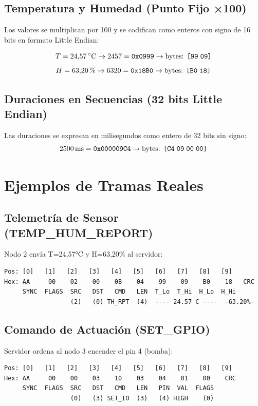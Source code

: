 \subsection{Temperatura y Humedad (Punto Fijo ×100)}

Los valores se multiplican por 100 y se codifican como enteros con signo de 16 bits
en formato Little Endian:

\[
T = 24{,}57\,^{\circ}\text{C} \rightarrow 2457 = \texttt{0x0999} \rightarrow \text{bytes: } \texttt{[99\;09]}
\]
\[
H = 63{,}20\,\% \rightarrow 6320 = \texttt{0x18B0} \rightarrow \text{bytes: } \texttt{[B0\;18]}
\]

\subsection{Duraciones en Secuencias (32 bits Little Endian)}

Las duraciones se expresan en milisegundos como entero de 32 bits sin signo:
\[
2500\,\text{ms} = \texttt{0x000009C4} \rightarrow \text{bytes: } \texttt{[C4\;09\;00\;00]}
\]

\section{Ejemplos de Tramas Reales}

\subsection{Telemetría de Sensor (TEMP\_HUM\_REPORT)}
Nodo 2 envía T=24,57°C y H=63,20\% al servidor:

\begin{lstlisting}[style=trama, caption={Trama TEMP\_HUM\_REPORT completa}]
Pos: [0]   [1]   [2]   [3]   [4]   [5]   [6]   [7]   [8]   [9]
Hex: AA     00    02    00    0B    04    99    09    B0    18   CRC
     SYNC  FLAGS  SRC   DST   CMD   LEN  T_Lo  T_Hi  H_Lo  H_Hi
                  (2)   (0) TH_RPT  (4)  ---- 24.57 C ----  -63.20%-
\end{lstlisting}

\subsection{Comando de Actuación (SET\_GPIO)}
Servidor ordena al nodo 3 encender el pin 4 (bomba):

\begin{lstlisting}[style=trama, caption={Trama SET\_GPIO}]
Pos: [0]   [1]   [2]   [3]   [4]   [5]   [6]   [7]   [8]   [9]
Hex: AA     00    00    03    10    03    04    01    00    CRC
     SYNC  FLAGS  SRC   DST   CMD   LEN   PIN  VAL  FLAGS
                  (0)   (3) SET_IO  (3)   (4) HIGH    (0)
\end{lstlisting}

